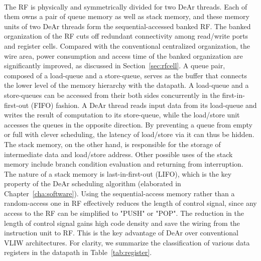 \\\indent
The RF is physically and symmetrically divided for two DeAr threads.
Each of them owns a pair of queue memory as well as stack memory, 
and these memory units of two DeAr threads form the sequential-accessed banked RF.
The banked organization of the RF cuts off redundant connectivity among read/write ports and register cells.
Compared with the conventional centralized organization, 
the wire area, power consumption and access time of the banked organization are significantly improved, as discussed in Section~\ref{sec:rfcell}.
A queue pair, composed of a load-queue and a store-queue, 
serves as the buffer that connects the lower level of the memory hierarchy with the datapath.
A load-queue and a store-queues can be accessed from their both sides concurrently in the first-in-first-out (FIFO) fashion.
A DeAr thread reads input data from its load-queue and writes the result of computation to its store-queue, 
while the load/store unit accesses the queues in the opposite direction.
By preventing a queue from empty or full with clever scheduling, the latency of load/store via it can thus be hidden.
The stack memory, on the other hand, is responsible for the storage of intermediate data and load/store address.
Other possible uses of the stack memory include branch condition evaluation and returning from interruption.
The nature of a stack memory is last-in-first-out (LIFO), 
which is the key property of the DeAr scheduling algorithm (elaborated in Chapter~\ref{cha:software}).
Using the sequential-access memory rather than a random-access one in RF effectively reduces the length of control signal, 
since any access to the RF can be simplified to "PUSH" or "POP".
The reduction in the length of control signal gains high code density and save the wiring from the instruction unit to RF.
This is the key advantage of DeAr over conventional VLIW architectures.
For clarity, we summarize the classification of various data registers in the datapath in Table~\ref{tab:register}.
